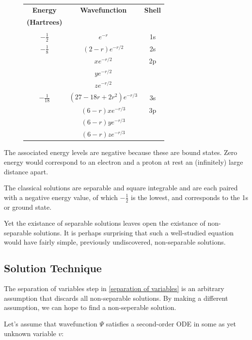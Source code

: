 \documentclass{article}
\begin{document}
\begin{figure}
\begin{center}
\begin{tabular}{ccc}
{\bf Energy}		& {\bf Wavefunction}		& {\bf Shell} \\
{\bf (Hartrees)}	& & \\
\\
$-\frac{1}{2}$		& $e^{-r}$			& 1s \\
$-\frac{1}{8}$		& $(2-r)e^{-r/2}$		& 2s \\
			& $xe^{-r/2}$			& 2p \\
			& $ye^{-r/2}$			\\
			& $ze^{-r/2}$			\\
$-\frac{1}{18}$		& $(27-18r+2r^2)e^{-r/3}$	& 3s \\
			& $(6-r)xe^{-r/3}$		& 3p \\
			& $(6-r)ye^{-r/3}$		\\
			& $(6-r)ze^{-r/3}$		\\
\end{tabular}
\end{center}
\end{figure}

The associated energy levels are negative because these are bound states.  Zero energy
would correspond to an electron and a proton at rest an (infinitely) large distance apart.

The classical solutions are separable and square integrable
and are each paired with a negative energy value, of which $-\frac{1}{2}$ is the lowest,
and corresponds to the 1s or ground state.

Yet the existance of separable solutions leaves open the existance of non-separable solutions.
It is perhaps surprising that such a well-studied equation would have fairly simple, previously
undiscovered, non-separable solutions.

\subsection*{Solution Technique}

The separation of variables step in \eqref{separation of variables} is an arbitrary assumption
that discards all non-separable solutions.  By making a different assumption, we can
hope to find a non-seperable solution.

Let's assume that wavefunction $\Psi$ satisfies a second-order ODE in some as yet unknown variable $v$:
\end{document}

